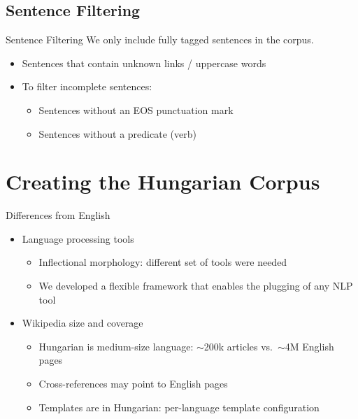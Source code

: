 \documentclass[utf8x,t]{beamer}
\newcommand{\vitem}{\vfill \item}
\newcommand{\nagytilde}{$\sim$}
\begin{document}
\subsection{Sentence Filtering}
\begin{frame}{Sentence Filtering}
  We only include fully tagged sentences in the corpus.
  \begin{itemize}
  \vitem Sentences that contain unknown links / uppercase words
  \vitem To filter incomplete sentences:
    \begin{itemize}
    \vitem Sentences without an EOS punctuation mark
    \vitem Sentences without a predicate (verb)
    \end{itemize}
  \end{itemize}
  \vfill
\end{frame}

\section{Creating the Hungarian Corpus}


\begin{frame}{Differences from English}
  \begin{itemize}
  \vitem Language processing tools
    \begin{itemize}
    \vitem Inflectional morphology: different set of tools were needed 
    \vitem We developed a flexible framework that enables the plugging of any NLP tool
    \end{itemize}
  \vitem Wikipedia size and coverage
    \begin{itemize}
    \vitem Hungarian is medium-size language: \nagytilde 200k articles vs.~\nagytilde 4M English pages
    \vitem Cross-references may point to English pages
    \vitem Templates are in Hungarian: per-language template configuration
    \end{itemize}
  \end{itemize}
\end{frame}
\end{document}
